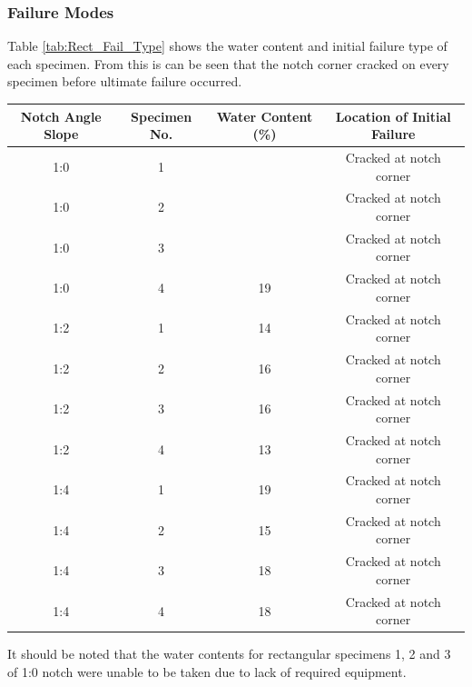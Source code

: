\documentclass[11pt,a4paper]{article}
\numberwithin{equation}{subsection}
\begin{document}
\subsubsection{Failure Modes}
Table \ref{tab:Rect_Fail_Type} shows the water content and initial failure type of each specimen. From this is can be seen that the notch corner cracked on every specimen before ultimate failure occurred.

\vspace*{\baselineskip}

\begin{center}
	\begin{tabular}{|c|c|c|c|} 
		\hline
		
		\textbf{Notch Angle Slope} & \textbf{Specimen No.} & \textbf{Water Content (\%)} & \textbf{Location of Initial Failure}\\ [0.5ex]
		\hline
		
		1:0 & 1 &  & Cracked at notch corner \\ [0.5ex]
		\hline
		1:0 & 2 &  & Cracked at notch corner \\ [0.5ex]
		\hline
		1:0 & 3 &  & Cracked at notch corner \\ [0.5ex]
		\hline
		1:0 & 4 & 19 & Cracked at notch corner \\ [0.5ex]
		\hline
		
		1:2 & 1 & 14 & Cracked at notch corner \\ [0.5ex]
		\hline
		1:2 & 2 & 16 & Cracked at notch corner \\ [0.5ex]
		\hline
		1:2 & 3 & 16 & Cracked at notch corner \\ [0.5ex]
		\hline
		1:2 & 4 & 13 & Cracked at notch corner \\ [0.5ex]
		\hline
		
		1:4 & 1 & 19 & Cracked at notch corner \\ [0.5ex]
		\hline
		1:4 & 2 & 15 & Cracked at notch corner \\ [0.5ex]
		\hline
		1:4 & 3 & 18 & Cracked at notch corner \\ [0.5ex]
		\hline
		1:4 & 4 & 18 & Cracked at notch corner \\ [0.5ex]
		\hline
	\end{tabular}
	\label{tab:Rect_Fail_Type}
\end{center}

\vspace*{\baselineskip}
\noindent
It should be noted that the water contents for rectangular specimens 1, 2 and 3 of 1:0 notch were unable to be taken due to lack of required equipment.
\end{document}
